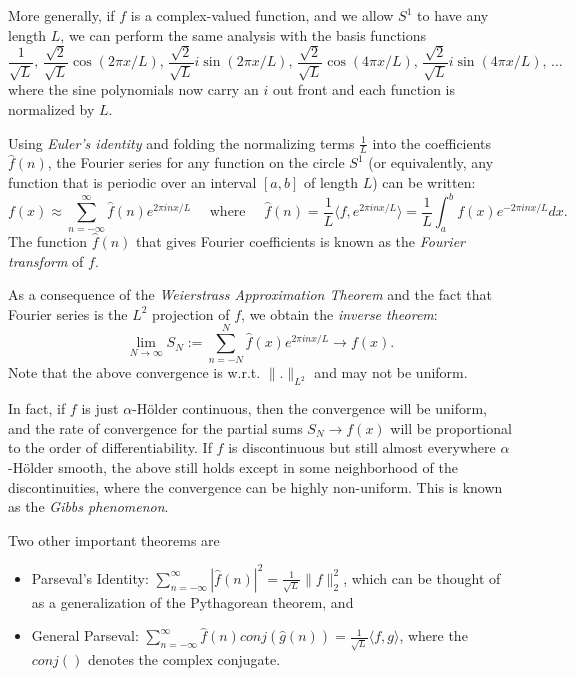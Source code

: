 \documentclass[12pt]{article}
\begin{document}
More generally, if $f$ is a complex-valued function, and we allow $S^1$ to have
any length $L$, we can perform the same analysis with the basis functions 
$$
\frac{1}{\sqrt{L}}
\text{, }\frac{\sqrt{2}}{\sqrt{L}}\cos(2\pi x/L)
\text{, }\frac{\sqrt{2}}{\sqrt{L}}i\sin(2\pi x/L)
\text{, }\frac{\sqrt{2}}{\sqrt{L}}\cos(4\pi x/L)
\text{, }\frac{\sqrt{2}}{\sqrt{L}}i\sin(4\pi x/L)
\text{, }\ldots
$$
where the sine polynomials now carry an $i$ out front and each function is 
normalized by $L$.

Using {\it Euler's identity} and folding the normalizing terms $\frac{1}{L}$ 
into the coefficients $\hat{f}(n)$, the Fourier series for any function
on the circle $S^1$ (or equivalently, any function that is periodic
over an interval $[a,b]$ of length $L$) can be written:
$$
f(x) \approx \sum_{n=-\infty}^\infty \hat{f}(n) e^{2\pi inx/L}
\quad\text{ where }\quad
\hat{f}(n)
=\frac{1}{L}\langle f, e^{2\pi inx/L}\rangle
=\frac{1}{L}\int_a^bf(x)e^{-2\pi inx/L}dx.
$$
The function $\hat{f}(n)$ that gives Fourier coefficients is known as the 
{\it Fourier transform} of $f$.

As a consequence of the {\it Weierstrass Approximation Theorem} and the
fact that Fourier series is the $L^2$ projection of $f$, we obtain the
{\it inverse theorem}:
$$
\lim_{N\rightarrow\infty} S_N := \sum_{n=-N}^N \hat{f}(x)e^{2\pi inx/L} \rightarrow f(x).
$$
Note that the above convergence is w.r.t. $\|.\|_{L^2}$ and may not be uniform.

In fact, if $f$ is just $\alpha$-H{\"o}lder continuous, then the convergence
will be uniform, and the rate of convergence for the partial sums
$S_N \rightarrow f(x)$ will be
proportional to the order of differentiability.
If $f$ is discontinuous but still almost everywhere $\alpha$-H{\"o}lder smooth, 
the above still holds except in some neighborhood of the discontinuities, 
where the convergence can be highly non-uniform.
This is known as the {\it Gibbs phenomenon}.

Two other important theorems are
\begin{itemize}
\item Parseval's Identity: 
$\sum_{n=-\infty}^\infty|\hat{f}(n)|^2 = \frac{1}{\sqrt{L}}\|f\|_2^2$,
which can be thought of as a generalization of the Pythagorean theorem, and
\item General Parseval:
$\sum_{n=-\infty}^\infty\hat{f}(n)conj(\hat{g}(n)) = \frac{1}{\sqrt{L}}\langle f,g\rangle$,
where the $conj()$ denotes the complex conjugate.
\end{itemize}
\end{document}
